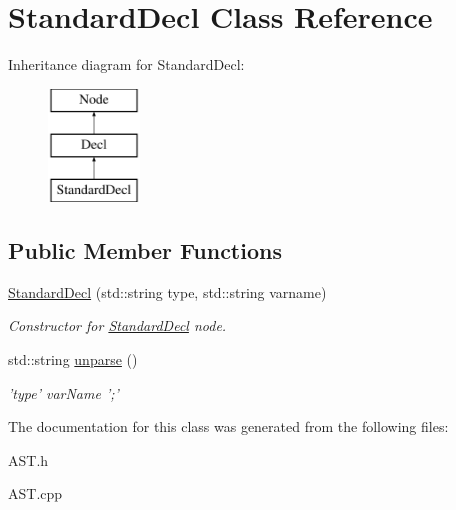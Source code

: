 \hypertarget{classStandardDecl}{\section{Standard\-Decl Class Reference}
\label{classStandardDecl}
}
Inheritance diagram for Standard\-Decl\-:\begin{figure}[H]
\begin{center}
\leavevmode
\includegraphics[height=3.000000cm]{classStandardDecl}
\end{center}
\end{figure}
\subsection*{Public Member Functions}
\begin{DoxyCompactItemize}
\item 
\hypertarget{classStandardDecl_afee7fe259f18de1164cd3bd4c94e8fb1}{\hyperlink{classStandardDecl_afee7fe259f18de1164cd3bd4c94e8fb1}{Standard\-Decl} (std\-::string type, std\-::string varname)}\label{classStandardDecl_afee7fe259f18de1164cd3bd4c94e8fb1}

\begin{DoxyCompactList}\small\item\em Constructor for \hyperlink{classStandardDecl}{Standard\-Decl} node. \end{DoxyCompactList}\item 
\hypertarget{classStandardDecl_a2666e01d836103d4a4338a2c54106db5}{std\-::string \hyperlink{classStandardDecl_a2666e01d836103d4a4338a2c54106db5}{unparse} ()}\label{classStandardDecl_a2666e01d836103d4a4338a2c54106db5}

\begin{DoxyCompactList}\small\item\em 'type' var\-Name ';' \end{DoxyCompactList}\end{DoxyCompactItemize}


The documentation for this class was generated from the following files\-:\begin{DoxyCompactItemize}
\item 
A\-S\-T.\-h\item 
A\-S\-T.\-cpp\end{DoxyCompactItemize}
